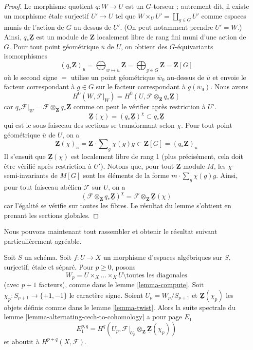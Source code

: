 \begin{proof}
Le morphisme quotient $q : W \to U$ est un $G$-torseur ; autrement dit, il existe
un morphisme étale surjectif $U' \to U$ tel que
$W \times_U U' = \coprod_{g \in G} U'$ comme espaces munis de l'action de $G$ au-dessus de $U'$.
(On peut notamment prendre $U' = W$.) Ainsi, $q_*\underline{\mathbf{Z}}$ est un
module de $\mathbf{Z}$ localement libre de rang fini muni d'une action de $G$.
Pour tout point géométrique $\overline{u}$ de $U$, on obtient des $G$-équivariants
isomorphismes
$$
(q_*\underline{\mathbf{Z}})_{\overline{u}}
= \bigoplus\nolimits_{\overline{w} \mapsto \overline{u}} \mathbf{Z}
= \bigoplus\nolimits_{g \in G} \mathbf{Z} = \mathbf{Z}[G]
$$
où le second signe $=$ utilise un point géométrique
$\overline{w}_0$ au-dessus de $\overline{u}$ et
envoie le facteur correspondant à $g \in G$ sur le facteur
correspondant à $g(\overline{w}_0)$. Nous avons
$$
H^0(W, \mathcal{F}|_W) =
H^0(U, \mathcal{F} \otimes_\mathbf{Z} q_*\underline{\mathbf{Z}})
$$
car
$q_*\mathcal{F}|_W = \mathcal{F} \otimes_\mathbf{Z} q_*\underline{\mathbf{Z}}$
comme on peut le vérifier après restriction à $U'$.
$$
\underline{\mathbf{Z}}(\chi) =
(q_*\underline{\mathbf{Z}})^\chi \subset
q_*\underline{\mathbf{Z}}
$$
qui est le sous-faisceau des sections se transformant selon $\chi$.
Pour tout point géométrique $\overline{u}$ de $U$, on a
$$
\underline{\mathbf{Z}}(\chi)_{\overline{u}} =
\mathbf{Z} \cdot \sum\nolimits_g \chi(g) g
\subset
\mathbf{Z}[G] = (q_*\underline{\mathbf{Z}})_{\overline{u}}
$$
Il s'ensuit que $\underline{\mathbf{Z}}(\chi)$ est localement libre de
rang 1 (plus précisément, cela doit être vérifié après restriction à $U'$).
Notons que, pour tout $\mathbf{Z}$-module $M$, les $\chi$-semi-invariants
de $M[G]$ sont les éléments de la forme $m \cdot \sum\nolimits_g \chi(g) g$.
Ainsi, pour tout faisceau abélien $\mathcal{F}$ sur $U$, on a
$$
\left(\mathcal{F} \otimes_\mathbf{Z} q_*\underline{\mathbf{Z}}\right)^\chi
=
\mathcal{F} \otimes_\mathbf{Z} \underline{\mathbf{Z}}(\chi)
$$
car l'égalité se vérifie sur toutes les fibres. Le résultat du lemme s'obtient en
prenant les sections globales.
\end{proof}

\noindent
Nous pouvons maintenant tout rassembler et obtenir le résultat suivant
particulièrement agréable.

\begin{lemma}
\label{lemma-alternating-spectral-sequence}
Soit $S$ un schéma. Soit $f : U \to X$ un morphisme d'espaces algébriques
sur $S$, surjectif, \'etale et séparé. Pour $p \geq 0$, posons
$$
W_p = U \times_X \ldots \times_X U \setminus \text{toutes les diagonales}
$$
(avec $p + 1$ facteurs), comme dans le lemme \ref{lemma-compute}.
Soit $\chi_p : S_{p + 1} \to \{+1, -1\}$ le caractère signe.
Soient $U_p = W_p/S_{p + 1}$ et $\underline{\mathbf{Z}}(\chi_p)$ les objets définis comme dans le
lemme \ref{lemma-twist}.
Alors la suite spectrale du
lemme \ref{lemma-alternating-cech-to-cohomology}
a pour page $E_1$
$$
E_1^{p, q} =
H^q(U_p, \mathcal{F}|_{U_p} \otimes_\mathbf{Z} \underline{\mathbf{Z}}(\chi_p))
$$
et aboutit à $H^{p + q}(X, \mathcal{F})$.
\end{lemma}

